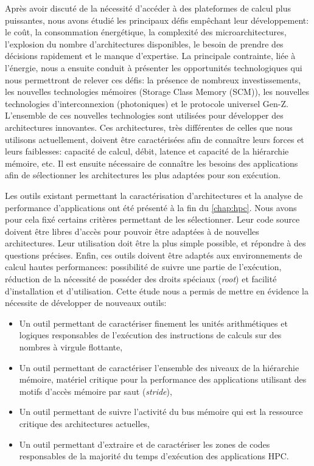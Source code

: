         Après avoir discuté de la nécessité d'accéder à des plateformes de calcul plus puissantes, nous avons étudié les principaux défis empêchant leur développement: le coût, la consommation énergétique, la complexité des microarchitectures, l'explosion du nombre d'architectures disponibles, le besoin de prendre des décisions rapidement et le manque d'expertise. 
        La principale contrainte, liée à l'énergie, nous a ensuite conduit à présenter les opportunités technologiques qui nous permettront de relever ces défis: la présence de nombreux investissements, les nouvelles technologies mémoires (Storage Class Memory (SCM)), les nouvelles technologies d'interconnexion (photoniques) et le protocole universel Gen-Z.
        L'ensemble de ces nouvelles technologies sont utilisées pour développer des architectures innovantes. Ces architectures, très différentes de celles que nous utilisons actuellement, doivent être caractérisées afin de connaître leurs forces et leurs faiblesses: capacité de calcul, débit, latence et capacité de la hiérarchie mémoire, etc. Il est ensuite nécessaire de connaître les besoins des applications afin de sélectionner les architectures les plus adaptées pour son exécution. 
        
        Les outils existant permettant la caractérisation d'architectures et la analyse de performance d'applications ont été présenté à la fin du \autoref{chap:hpc}. Nous avons pour cela fixé certains critères permettant de les sélectionner. Leur code source doivent être libres d'accès pour pouvoir être adaptées à de nouvelles architectures. Leur utilisation doit être la plus simple possible, et répondre à des questions précises. Enfin, ces outils doivent être adaptés aux environnements de calcul hautes performances: possibilité de suivre une partie de l'exécution, réduction de la nécessité de posséder des droits spéciaux (\textit{root}) et facilité d'installation et d'utilisation. Cette étude nous a permis de mettre en évidence la nécessite de développer de nouveaux outils:
        \begin{itemize}
            \item Un outil permettant de caractériser finement les unités arithmétiques et logiques responsables de l'exécution des instructions de calculs sur des nombres à virgule flottante, 
            \item Un outil permettant de caractériser l'ensemble des niveaux de la hiérarchie mémoire, matériel critique pour la performance des applications utilisant des motifs d'accès mémoire par saut (\textit{stride}),
            \item Un outil permettant de suivre l'activité du bus mémoire qui est la ressource critique des architectures actuelles,
            \item Un outil permettant d'extraire et de caractériser les zones de codes responsables de la majorité du temps d'exécution des applications HPC.
        \end{itemize}
        
